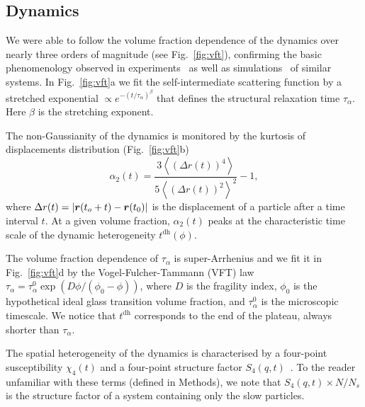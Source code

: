 \subsection*{Dynamics}

We were able to follow the volume fraction dependence of the dynamics over nearly three orders of magnitude (see Fig.~\ref{fig:vft}), confirming the basic phenomenology observed in experiments~\citep{pusey1987ogt, kegel2000swe, weeks2000, BerthierR} as well as simulations~\citep{tanaka2010critical} of similar systems. In Fig.~\ref{fig:vft}a we fit the self-intermediate scattering function by a stretched exponential $\propto e^{-(t/\tau_\alpha)^\beta}$ that defines the structural relaxation time $\tau_\alpha$. 
Here $\beta$ is the stretching exponent. 

The non-Gaussianity of the dynamics is monitored by the kurtosis of displacements distribution (Fig.~\ref{fig:vft}b)
\begin{equation}
	\alpha_2(t) = \frac{3 \left\langle {(\Delta r(t))^4} \right\rangle}{5 {\left\langle {(\Delta r(t))^2} \right\rangle}^2}-1, 
	\label{eq:ng}
\end{equation}
where $\Delta r(t)= |\mbox{\boldmath$r$}(t_o+t)- \mbox{\boldmath$r$}(t_0)|$ is the displacement of a particle after a time interval $t$. At a given volume fraction, $\alpha_2(t)$ peaks at the characteristic time scale of the dynamic heterogeneity $t^\text{dh}(\phi)$.

The volume fraction dependence of $\tau_\alpha$ is super-Arrhenius and we fit it in Fig.~\ref{fig:vft}d by the Vogel-Fulcher-Tammann (VFT) law $\tau_\alpha=\tau_\alpha^0 \exp(D\phi/(\phi_0-\phi))$, where $D$ is the fragility index, $\phi_0$ is the hypothetical ideal glass transition volume fraction, and $\tau_\alpha^0$ is the microscopic timescale.  We notice that $t^\text{dh}$ corresponds to the end of the plateau, always shorter than $\tau_\alpha$.

The spatial heterogeneity of the dynamics is characterised by a four-point susceptibility $\chi_4(t)$ and a four-point structure factor $S_4(q,t)$~\cite{Flenner2011}. To the reader unfamiliar with these terms (defined in Methods), we note that $S_4(q,t)\times N/N_s$ is the structure factor of a system containing only the slow particles.

